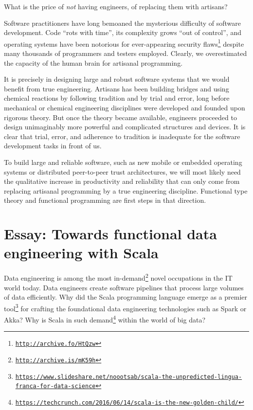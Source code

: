 What is the price of \emph{not} having engineers, of replacing them
with artisans?

Software practitioners have long bemoaned the mysterious difficulty
of software development. Code ``rots with time'', its complexity
grows ``out of control'', and operating systems have been notorious
for ever-appearing security flaws\footnote{\texttt{\href{http://archive.fo/HtQzw}{http://archive.fo/HtQzw}}}
despite many thousands of programmers and testers employed. Clearly,
we overestimated the capacity of the human brain for artisanal programming.

It is precisely in designing large and robust software systems that
we would benefit from true engineering. Artisans has been building
bridges and using chemical reactions by following tradition and by
trial and error, long before mechanical or chemical engineering disciplines
were developed and founded upon rigorous theory. But once the theory
became available, engineers proceeded to design unimaginably more
powerful and complicated structures and devices. It is clear that
trial, error, and adherence to tradition is inadequate for the software
development tasks in front of us. 

To build large and reliable software, such as new mobile or embedded
operating systems or distributed peer-to-peer trust architectures,
we will most likely need the qualitative increase in productivity
and reliability that can only come from replacing artisanal programming
by a true engineering discipline. Functional type theory and functional
programming are first steps in that direction.

\chapter{Essay: Towards functional data engineering with Scala}

Data engineering is among the most in-demand\footnote{\texttt{\href{http://archive.is/mK59h}{http://archive.is/mK59h}}}
novel occupations in the IT world today. Data engineers create software
pipelines that process large volumes of data efficiently. Why did
the Scala programming language emerge as a premier tool\footnote{\texttt{\href{https://www.slideshare.net/noootsab/scala-the-unpredicted-lingua-franca-for-data-science}{https://www.slideshare.net/noootsab/scala-the-unpredicted-lingua-franca-for-data-science}}}
for crafting the foundational data engineering technologies such as
Spark or Akka? Why is Scala in such demand\footnote{\texttt{\href{https://techcrunch.com/2016/06/14/scala-is-the-new-golden-child/}{https://techcrunch.com/2016/06/14/scala-is-the-new-golden-child/}}}
within the world of big data?

